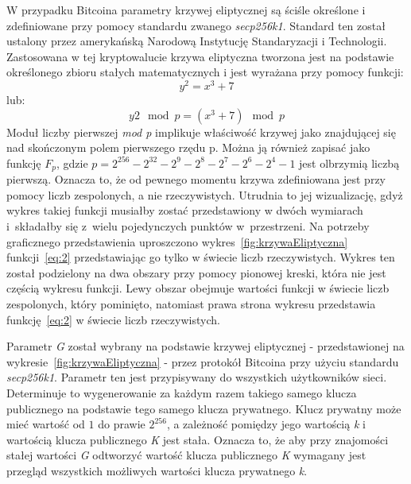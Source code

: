 \documentclass[12pt, twoside, final, openany]{mgr}
\begin{document}
\indent W przypadku Bitcoina parametry krzywej eliptycznej są ściśle określone i zdefiniowane przy pomocy standardu zwanego \textit{secp256k1}. Standard ten został ustalony przez amerykańską Narodową Instytucję Standaryzacji i Technologii. Zastosowana w tej kryptowalucie krzywa eliptyczna tworzona jest na podstawie określonego zbioru stałych matematycznych i jest wyrażana przy pomocy funkcji:
\begin{equation}
  y^2 = x^3 + 7 
\end{equation} 
\label{eq:2}
lub:
\begin{equation} 
\label{eq:3}
  y2 \mod p = (x^3 + 7) \mod p
\end{equation}
Moduł liczby pierwszej \textit{mod p} implikuje właściwość krzywej jako znajdującej się nad skończonym polem pierwszego rzędu p. Można ją również zapisać jako funkcję $F_p$, gdzie $p = 2^{256} - 2^{32} - 2^9 - 2^8 - 2^7 - 2^6 - 2^4 - 1$ jest olbrzymią liczbą pierwszą. Oznacza to, że od pewnego momentu krzywa zdefiniowana jest przy pomocy liczb zespolonych, a nie rzeczywistych. Utrudnia to jej wizualizację, gdyż wykres takiej funkcji musiałby zostać przedstawiony w dwóch wymiarach i~składałby się z~wielu pojedynczych punktów w~przestrzeni. Na potrzeby graficznego przedstawienia uproszczono wykres~\ref{fig:krzywaEliptyczna} funkcji~\ref{eq:2} przedstawiając go tylko w świecie liczb rzeczywistych. Wykres ten został podzielony na dwa obszary przy pomocy pionowej kreski, która nie jest częścią wykresu funkcji. Lewy obszar obejmuje wartości funkcji w świecie liczb zespolonych, który pominięto, natomiast prawa strona wykresu przedstawia funkcję~\ref{eq:2} w świecie liczb rzeczywistych.

\indent Parametr \textit{G} został wybrany na podstawie krzywej eliptycznej - przedstawionej na wykresie~\ref{fig:krzywaEliptyczna} - przez protokół Bitcoina przy użyciu standardu \textit{secp256k1}. Parametr ten jest przypisywany do wszystkich użytkowników sieci. Determinuje to wygenerowanie za każdym razem takiego samego klucza publicznego na podstawie tego samego klucza prywatnego. Klucz prywatny może mieć wartość od $1$ do prawie $2^{256}$, a zależność pomiędzy jego wartością \textit{k} i wartością klucza publicznego \textit{K} jest stała. Oznacza to, że aby przy znajomości stałej wartości \textit{G} odtworzyć wartość klucza publicznego \textit{K} wymagany jest przegląd wszystkich możliwych wartości klucza prywatnego \textit{k}. 
\end{document}
